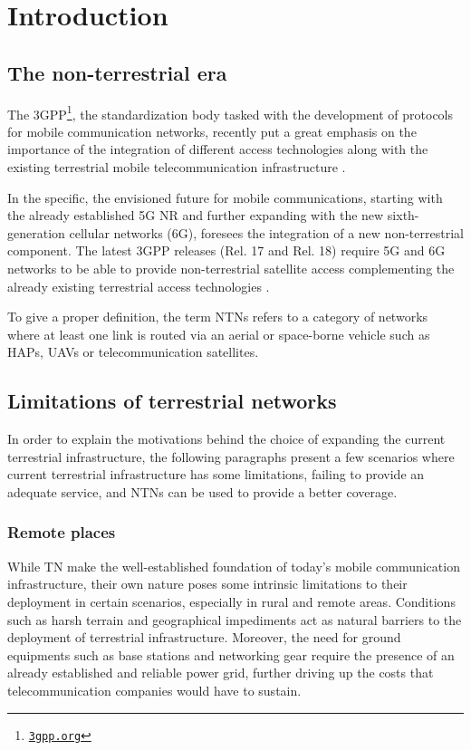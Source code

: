 
\chapter{Introduction}
\label{chp:intro}

\section{The non-terrestrial era}
The \ac{3GPP}\footnote{\href{https://www.3gpp.org}{\texttt{3gpp.org}}}, the standardization body tasked with the development of protocols for mobile communication networks, recently put a great emphasis on the importance of the integration of different access technologies along with the existing terrestrial mobile telecommunication infrastructure \cite{3gpp-tr-21.917}.

In the specific, the envisioned future for mobile communications, starting with the already established 5G \ac{NR} and further expanding with the new sixth-generation cellular networks (6G), foresees the integration of a new non-terrestrial component. The latest \ac{3GPP} releases (Rel. 17 and Rel. 18) require 5G and 6G networks to be able to provide non-terrestrial satellite access complementing the already existing terrestrial access technologies \cite{overview-rel-17-18-saad} \cite{5g-nr-communication-geo-leo-maattanen}.

To give a proper definition, the term \ac{NTNs} refers to a category of networks where at least one link is routed via an aerial or space-borne vehicle such as \ac{HAPs}, \ac{UAVs} or telecommunication satellites.

\section{Limitations of terrestrial networks}
In order to explain the motivations behind the choice of expanding the current terrestrial infrastructure, the following paragraphs present a few scenarios where current terrestrial infrastructure has some limitations, failing to provide an adequate service, and \ac{NTNs} can be used to provide a better coverage.

\subsection{Remote places}
While \ac{TN} make the well-established foundation of today’s mobile communication infrastructure, their own nature poses some intrinsic limitations to their deployment in certain scenarios, especially in rural and remote areas. Conditions such as harsh terrain and geographical impediments act as natural barriers to the deployment of terrestrial infrastructure. Moreover, the need for ground equipments such as base stations and networking gear require the presence of an already established and reliable power grid, further driving up the costs that telecommunication companies would have to sustain.

